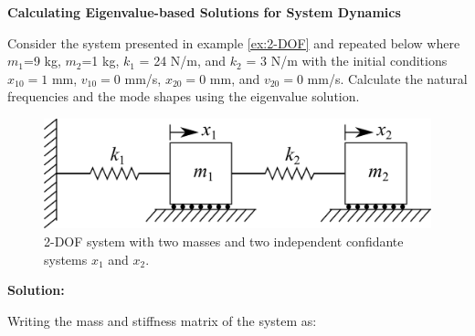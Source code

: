 \documentclass[12pt,letter]{article}
\begin{document}
	
	\begin{example}

	\noindent \textbf{Calculating Eigenvalue-based Solutions for System Dynamics}  

	\noindent Consider the system presented in example \ref{ex:2-DOF} and repeated below where $m_1$=9 kg, $m_2$=1 kg, $k_1$ = 24 N/m, and $k_2$ = 3 N/m with the initial conditions $x_{10}=1$ mm, $v_{10}=0$ mm/s, $x_{20}=0$ mm, and $v_{20}=0$ mm/s. Calculate the natural frequencies and the mode shapes using the eigenvalue solution. 
	\begin{figure}[H]
		\centering
		\includegraphics[]{../figures/2-DOF-spring_mass_horizontal.png}
		\caption{2-DOF system with two masses and two independent confidante systems $x_1$ and $x_2$.}
	\end{figure}
	
	
	
	
\noindent \textbf{Solution:}  

\noindent Writing the mass and stiffness matrix of the system as:
	

\end{example}
\end{document}
